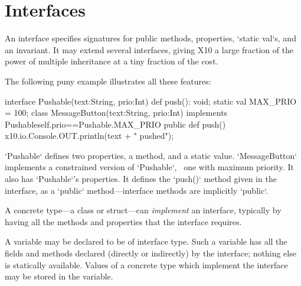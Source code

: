 \chapter{Interfaces}
\label{XtenInterfaces}

An interface specifies signatures for public methods, properties,
\xcd`static val`s, and an invariant. It may extend several interfaces, giving
X10 a large fraction of the power of multiple inheritance at a tiny fraction
of the cost.

The following puny example illustrates all these features: 
\begin{xten}
interface Pushable(text:String, prio:Int) {
  def push(): void;
  static val MAX_PRIO = 100;
}
class MessageButton(text:String, prio:Int) 
  implements Pushable{self.prio==Pushable.MAX_PRIO} {
  public def push() { 
    x10.io.Console.OUT.println(text + " pushed");
  }
}
\end{xten}
%
\noindent
\xcd`Pushable` defines two properties, a method, and a static value.  
\xcd`MessageButton` implements a constrained version of \xcd`Pushable`,
\viz\ one with maximum priority.  It also has \xcd`Pushable`'s properties.  It
defines the \xcd`push()` method given in the interface, as a \xcd`public`
method---interface methods are implicitly \xcd`public`.

A concrete type---a class or struct---can {\em implement} an interface,
typically by having all the methods and properties that the interface
requires.

A variable may be declared to be of interface type.  Such a variable has all
the fields and methods declared (directly or indirectly) by the interface;
nothing else is statically available.  Values of a concrete type which
implement the interface may be stored in the variable.  


\label{DepType:Interface}

